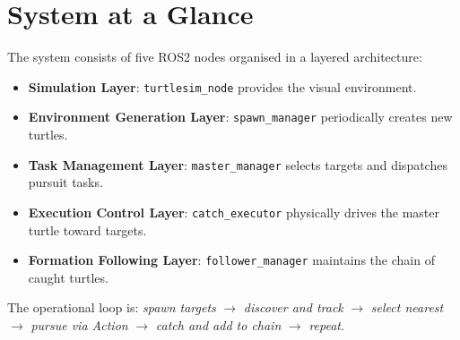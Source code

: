 \section{System at a Glance}

The system consists of five ROS2 nodes organised in a layered architecture:

\begin{itemize}
  \item \textbf{Simulation Layer}: \texttt{turtlesim\_node} provides the visual environment.
  \item \textbf{Environment Generation Layer}: \texttt{spawn\_manager} periodically creates new turtles.
  \item \textbf{Task Management Layer}: \texttt{master\_manager} selects targets and dispatches pursuit tasks.
  \item \textbf{Execution Control Layer}: \texttt{catch\_executor} physically drives the master turtle toward targets.
  \item \textbf{Formation Following Layer}: \texttt{follower\_manager} maintains the chain of caught turtles.
\end{itemize}

The operational loop is: \textit{spawn targets} $\rightarrow$ \textit{discover and track} $\rightarrow$ \textit{select nearest} $\rightarrow$ \textit{pursue via Action} $\rightarrow$ \textit{catch and add to chain} $\rightarrow$ \textit{repeat}.
